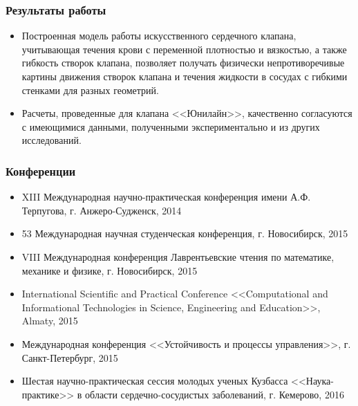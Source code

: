 \documentclass[14pt]{beamer}
\begin{document}
\begin{frame}
\frametitle{Результаты работы}
    \begin{itemize}
        \item[\MVRightarrow] Построенная модель работы искусственного сердечного
            клапана, учитывающая течения крови с переменной плотностью и
            вязкостью, а также гибкость створок клапана, позволяет получать физически непротиворечивые картины движения створок клапана и течения жидкости в сосудах с гибкими стенками для разных геометрий.
        \item[\MVRightarrow] Расчеты, проведенные для клапана <<Юнилайн>>,
            качественно согласуются с имеющимися данными, полученными
            экспериментально и из других исследований.
    \end{itemize}
\end{frame}

\begin{frame}
\frametitle{Конференции}
    {\tiny
        \begin{itemize}
            \item[\MVRightarrow] XIII Международная научно-практическая конференция имени А.Ф. Терпугова, г. Анжеро-Судженск, 2014
            \item[\MVRightarrow] 53 Международная научная студенческая конференция, г. Новосибирск, 2015
            \item[\MVRightarrow] VIII Международная конференция Лаврентьевские чтения по математике, механике и физике, г. Новосибирск, 2015
            \item[\MVRightarrow] International Scientific and Practical Conference <<Computational and Informational Technologies in Science, Engineering and Education>>, Almaty, 2015
            \item[\MVRightarrow] Международная конференция <<Устойчивость и процессы управления>>, г. Санкт-Петербург, 2015
            \item[\MVRightarrow] Шестая научно-практическая сессия молодых ученых Кузбасса <<Наука-практике>> в области сердечно-сосудистых заболеваний, г. Кемерово, 2016
        \end{itemize}
    }
\end{frame}
\end{document}

